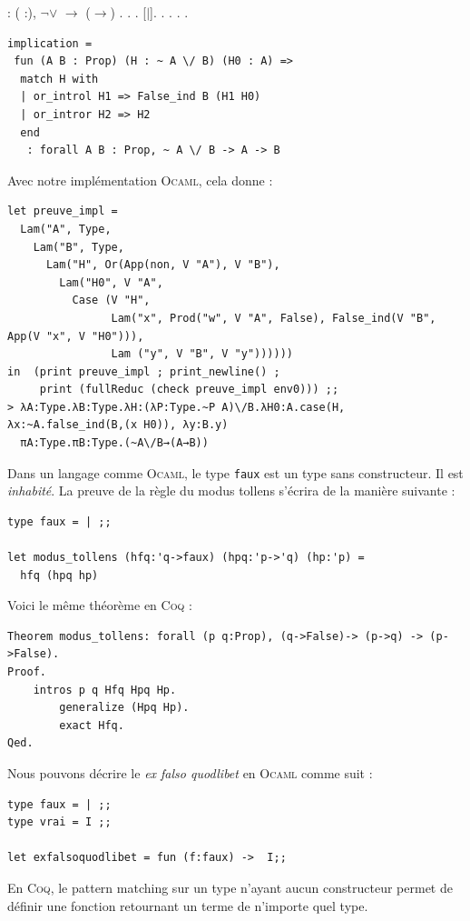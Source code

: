 \begin{coqdoccode}
\coqdocnoindent
{}  : \coqdockw{\ensuremath{\forall}} ( :), \ensuremath{\lnot}\ensuremath{\lor} \ensuremath{\rightarrow} (\ensuremath{\rightarrow}) .\coqdoceol
\coqdocnoindent
{}.\coqdoceol
\coqdocindent{1.00em}
.\coqdoceol
\coqdocindent{1.00em}
   [\ensuremath{|}].\coqdoceol
\coqdocindent{1.00em}
.\coqdoceol
\coqdocindent{1.00em}
.\coqdoceol
\coqdocnoindent
{}.\coqdoceol
\coqdocemptyline
\coqdocnoindent
{} .\coqdoceol
\begin{Verbatim}
implication = 
 fun (A B : Prop) (H : ~ A \/ B) (H0 : A) =>
  match H with
  | or_introl H1 => False_ind B (H1 H0)
  | or_intror H2 => H2
  end
   : forall A B : Prop, ~ A \/ B -> A -> B
\end{Verbatim}
\end{coqdoccode}


Avec notre implémentation \textsc{Ocaml}, cela donne :
\begin{verbatim}
let preuve_impl =
  Lam("A", Type,
    Lam("B", Type,
      Lam("H", Or(App(non, V "A"), V "B"),
        Lam("H0", V "A",
          Case (V "H", 
                Lam("x", Prod("w", V "A", False), False_ind(V "B", App(V "x", V "H0"))),
                Lam ("y", V "B", V "y")))))) 
in  (print preuve_impl ; print_newline() ;
     print (fullReduc (check preuve_impl env0))) ;;
> λA:Type.λB:Type.λH:(λP:Type.~P A)\/B.λH0:A.case(H, λx:~A.false_ind(B,(x H0)), λy:B.y)
  πA:Type.πB:Type.(~A\/B→(A→B))
\end{verbatim}

Dans un langage comme \textsc{Ocaml}, le type \verb+faux+ est un type sans constructeur.
Il est \textit{inhabité}. La preuve de la règle du modus tollens s'écrira de la manière suivante :
\begin{verbatim}
type faux = | ;;

let modus_tollens (hfq:'q->faux) (hpq:'p->'q) (hp:'p) =
  hfq (hpq hp)
\end{verbatim}
Voici le même théorème en \textsc{Coq} :
\begin{verbatim}
Theorem modus_tollens: forall (p q:Prop), (q->False)-> (p->q) -> (p->False).
Proof.
	intros p q Hfq Hpq Hp.
        generalize (Hpq Hp).
        exact Hfq.
Qed.
\end{verbatim}
Nous pouvons décrire le \textit{ex falso quodlibet} en \textsc{Ocaml} comme suit :
\begin{verbatim}
type faux = | ;;
type vrai = I ;;

let exfalsoquodlibet = fun (f:faux) ->  I;;
\end{verbatim}
En \textsc{Coq}, le pattern matching sur un type n'ayant aucun constructeur permet de 
définir une fonction retournant un terme de n'importe quel type.


